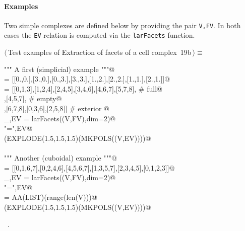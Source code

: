 \documentclass[11pt,oneside]{article}	%
\begin{document}
\paragraph{Examples}
Two simple complexes are defined below by providing the pair \texttt{V,FV}.
In both cases the \texttt{EV} relation is computed via the \texttt{larFacets} function.
\begin{flushleft} \small \label{scrap30}
\protect{}$\langle\,$Test examples of Extraction of facets of a cell complex\nobreak\ {\footnotesize 19b}$\,\rangle\equiv$
\vspace{-1ex}
\begin{list}{}{} \item
\mbox{}\verb@""" A first (simplicial) example """@\\
\mbox{}\verb@V = [[0.,0.],[3.,0.],[0.,3.],[3.,3.],[1.,2.],[2.,2.],[1.,1.],[2.,1.]]@\\
\mbox{}\verb@FV = [[0,1,3],[1,2,4],[2,4,5],[3,4,6],[4,6,7],[5,7,8], # full@\\
\mbox{}\verb@   [1,3,4],[4,5,7], # empty@\\
\mbox{}\verb@   [0,1,2],[6,7,8],[0,3,6],[2,5,8]] # exterior     @\\
\mbox{}\verb@_,EV = larFacets((V,FV),dim=2)@\\
\mbox{}\verb@print "\nEV =",EV@\\
\mbox{}\verb@VIEW(EXPLODE(1.5,1.5,1.5)(MKPOLS((V,EV))))@\\
\mbox{}\verb@@\\
\mbox{}\verb@""" Another (cuboidal) example """@\\
\mbox{}\verb@FV = [[0,1,6,7],[0,2,4,6],[4,5,6,7],[1,3,5,7],[2,3,4,5],[0,1,2,3]]@\\
\mbox{}\verb@_,EV = larFacets((V,FV),dim=2)@\\
\mbox{}\verb@print "\nEV =",EV@\\
\mbox{}\verb@VV = AA(LIST)(range(len(V)))@\\
\mbox{}\verb@VIEW(EXPLODE(1.5,1.5,1.5)(MKPOLS((V,EV))))@\\
\mbox{}\verb@@{\NWsep}
\end{list}
\vspace{-1ex}
\footnotesize\addtolength{\baselineskip}{-1ex}
\begin{list}{}{\setlength{\itemsep}{-\parsep}\setlength{\itemindent}{-\leftmargin}}
\item \NWtxtMacroRefIn\ .
\end{list}
\end{flushleft}
\end{document}

